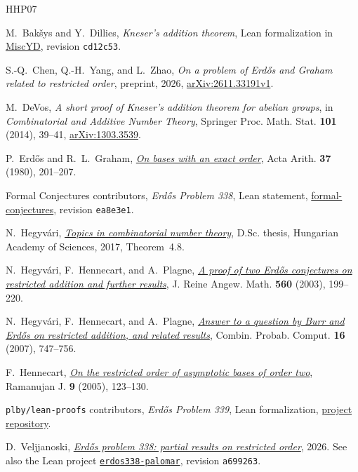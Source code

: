 \documentclass[11pt,reqno]{amsart}
\theoremstyle{definition}
\theoremstyle{remark}
\newcommand{\lean}[1]{\nolinkurl{#1}}
\begin{document}
\begin{thebibliography}{HHP07}

M.~Bak\v{s}ys and Y.~Dillies, \emph{Kneser's addition theorem}, Lean formalization
in \href{https://github.com/YaelDillies/misc-yd/tree/cd12c538d66f15a358a6904e7c847cd67661096f/MiscYD/AddCombi/Kneser}{MiscYD}, revision \lean{cd12c53}.

S.-Q.~Chen, Q.-H.~Yang, and L.~Zhao,
\emph{On a problem of Erd\H{o}s and Graham related to restricted order},
preprint, 2026, \href{https://arxiv.org/abs/2611.33191v1}{arXiv:2611.33191v1}.

M.~DeVos, \emph{A short proof of Kneser's addition theorem for abelian groups},
in \emph{Combinatorial and Additive Number Theory}, Springer Proc. Math. Stat.
\textbf{101} (2014), 39--41, \href{https://arxiv.org/abs/1303.3539}{arXiv:1303.3539}.

P.~Erd\H{o}s and R.~L.~Graham, \href{https://www.renyi.hu/~p_erdos/1980-22.pdf}{\emph{On bases with an exact order}},
Acta Arith. \textbf{37} (1980), 201--207.

Formal Conjectures contributors, \emph{Erd\H{o}s Problem 338}, Lean statement,
\href{https://github.com/google-deepmind/formal-conjectures/blob/ea8e3e198ded6fc73efb7f5653b74b28ac4ae1a8/FormalConjectures/ErdosProblems/338.lean}{formal-conjectures}, revision \lean{ea8e3e1}.

N.~Hegyv\'ari, \href{https://real-d.mtak.hu/1038/7/dc_1260_16_doktori_mu.pdf}{\emph{Topics in combinatorial number theory}}, D.Sc. thesis, Hungarian Academy of Sciences, 2017, Theorem~4.8.

N.~Hegyv\'ari, F.~Hennecart, and A.~Plagne,
\href{https://doi.org/10.1515/crll.2003.055}{\emph{A proof of two Erd\H{o}s conjectures on restricted addition and further results}},
J. Reine Angew. Math. \textbf{560} (2003), 199--220.

N.~Hegyv\'ari, F.~Hennecart, and A.~Plagne,
\href{https://www.cmls.polytechnique.fr/perso/plagne/Erdos-Burr.pdf}{\emph{Answer to a question by Burr and Erd\H{o}s on restricted addition, and related results}},
Combin. Probab. Comput. \textbf{16} (2007), 747--756.

F.~Hennecart, \href{https://doi.org/10.1007/s11139-005-0830-8}{\emph{On the restricted order of asymptotic bases of order two}},
Ramanujan J. \textbf{9} (2005), 123--130.

\texttt{plby/lean-proofs} contributors, \emph{Erd\H{o}s Problem 339},
Lean formalization, \href{https://github.com/plby/lean-proofs}{project repository}.

D.~Veljjanoski, \href{https://github.com/veljjanoski/erdos338}{\emph{Erd\H{o}s problem 338: partial results on restricted order}}, 2026.
See also the Lean project
\href{https://github.com/veljjanoski/erdos338-palomar/tree/a699263d0f7cdce0e5b3026bce86eab30973d0f8}{\texttt{erdos338-palomar}}, revision \lean{a699263}.

\end{thebibliography}
\end{document}
